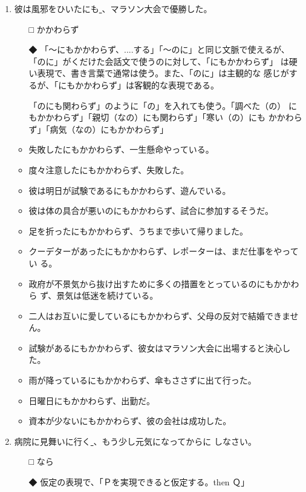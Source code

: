 \documentclass[
uplatex,
b5paper,
10pt,
dvipdfmx
]{jsbook}
\begin{document}
\begin{enumerate}
\item 彼は風邪をひいたにも\underline{     }、マラソン大会で優勝した。
\begin{itemize}
 \item[□] かかわらず
 \item[◆] 「〜にもかかわらず、....する」「〜のに」と同じ文脈で使えるが、
	   「のに」がくだけた会話文で使うのに対して、「にもかかわらず」
	   は硬い表現で、書き言葉で通常は使う。また、「のに」は主観的な
	   感じがするが、「にもかかわらず」は客観的な表現である。

	   「のにも関わらず」のように「の」を入れても使う。「調べた（の）
	   にもかかわらず」「親切（なの）にも関わらず」「寒い（の）にも
	   かかわらず」「病気（なの）にもかかわらず」
\end{itemize}

\begin{itemize}
\item 失敗したにもかかわらず、一生懸命やっている。
\item 度々注意したにもかかわらず、失敗した。
\item 彼は明日が試験であるにもかかわらず、遊んでいる。
\item 彼は体の具合が悪いのにもかかわらず、試合に参加するそうだ。
\item 足を折ったにもかかわらず、うちまで歩いて帰りました。
\item クーデターがあったにもかかわらず、レポーターは、まだ仕事をやってい
      る。
\item 政府が不景気から抜け出すために多くの措置をとっているのにもかかわら
      ず、景気は低迷を続けている。
\item 二人はお互いに愛しているにもかかわらず、父母の反対で結婚できません。
\item 試験があるにもかかわらず、彼女はマラソン大会に出場すると決心した。
\item 雨が降っているにもかかわらず、傘もささずに出て行った。
\item 日曜日にもかかわらず、出勤だ。
\item 資本が少ないにもかかわらず、彼の会社は成功した。
\end{itemize}

\item 病院に見舞いに行く\underline{    }、もう少し元気になってからに
      しなさい。

\begin{itemize}
\item[□] なら
\item[◆] 仮定の表現で、「Ｐを実現できると仮定する。then Ｑ」


\end{itemize}
\end{enumerate}
\end{document}
